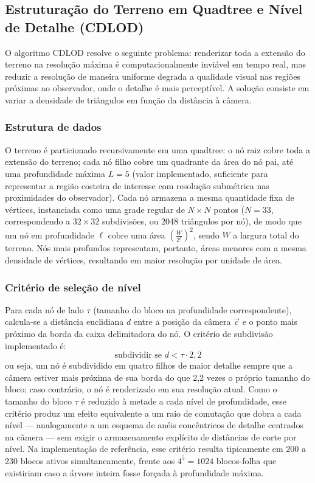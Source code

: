 \documentclass[conference]{IEEEtran}
\begin{document}
\subsection{Estruturação do Terreno em Quadtree e Nível de Detalhe (CDLOD)}

O algoritmo CDLOD \cite{strugar2009} resolve o seguinte problema:
renderizar toda a extensão do terreno na resolução máxima é
computacionalmente inviável em tempo real, mas reduzir a resolução de
maneira uniforme degrada a qualidade visual nas regiões próximas ao
observador, onde o detalhe é mais perceptível. A solução consiste em
variar a densidade de triângulos em função da distância à câmera.

\subsubsection{Estrutura de dados}
O terreno é particionado recursivamente em
uma quadtree: o nó raiz cobre toda a extensão do terreno; cada nó filho
cobre um quadrante da área do nó pai, até uma profundidade máxima
$L = 5$ (valor implementado, suficiente para representar a região
costeira de interesse com resolução submétrica nas proximidades do
observador). Cada nó armazena a mesma quantidade fixa de vértices,
instanciada como uma grade regular de $N \times N$ pontos ($N = 33$,
correspondendo a $32 \times 32$ subdivisões, ou 2048 triângulos por nó),
de modo que um nó em profundidade $\ell$ cobre uma área
$\left(\frac{W}{2^{\ell}}\right)^2$, sendo $W$ a largura total do
terreno. Nós mais profundos representam, portanto, áreas menores com a
mesma densidade de vértices, resultando em maior resolução por unidade de
área.

\subsubsection{Critério de seleção de nível}
Para cada nó de lado $\tau$
(tamanho do bloco na profundidade correspondente), calcula-se a distância
euclidiana $d$ entre a posição da câmera $\vec{c}$ e o ponto mais próximo
da borda da caixa delimitadora do nó. O critério de subdivisão
implementado é:
\begin{equation}
\text{subdividir se } d < \tau \cdot 2{,}2
\label{eq:subdivisao}
\end{equation}
ou seja, um nó é subdividido em quatro filhos de maior detalhe sempre que
a câmera estiver mais próxima de sua borda do que 2,2 vezes o próprio
tamanho do bloco; caso contrário, o nó é renderizado em sua resolução
atual. Como o tamanho do bloco $\tau$ é reduzido à metade a cada nível de
profundidade, esse critério produz um efeito equivalente a um raio de
comutação que dobra a cada nível --- analogamente a um esquema de anéis
concêntricos de detalhe centrados na câmera --- sem exigir o
armazenamento explícito de distâncias de corte por nível. Na
implementação de referência, esse critério resulta tipicamente em 200 a
230 blocos ativos simultaneamente, frente aos $4^5 = 1024$ blocos-folha
que existiriam caso a árvore inteira fosse forçada à profundidade máxima.
\end{document}
